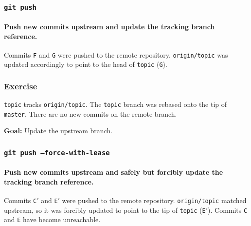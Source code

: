 \documentclass{beamer}
\newcommand\gitcmd[1]{\texttt{git #1}}
\newcommand\grefspec[1]{\texttt{#1}}
\newcommand\gbranch[1]{\texttt{#1}}
\newcommand\gremotebranch[1]{\texttt{#1}}
\newcommand\goal[1]{\textbf{Goal:} #1}
\begin{document}
\begin{frame}
  \frametitle{\gitcmd{push}}
  \framesubtitle{Push new commits upstream and update the tracking branch reference.}

  \begin{figure}
    \centering
  \end{figure}

  Commits \grefspec{F} and \grefspec{G} were pushed to the remote repository.
  \gremotebranch{origin/topic} was updated accordingly to point to the head of \gbranch{topic} (\grefspec{G}).
\end{frame}

\begin{frame}
  \frametitle{Exercise}

  \gbranch{topic} tracks \gbranch{origin/topic}. The \gbranch{topic} branch was rebased onto the tip of \gbranch{master}.
  There are no new commits on the remote branch.

  \goal{Update the upstream branch.}

  \begin{figure}
    \centering
  \end{figure}
\end{frame}

\begin{frame}
  \frametitle{\gitcmd{push --force-with-lease}}
  \framesubtitle{Push new commits upstream and safely but forcibly update the tracking branch reference.}

  \begin{figure}
    \centering
  \end{figure}

  Commits \grefspec{C$'$} and \grefspec{E$'$} were pushed to the remote repository.
  \gremotebranch{origin/topic} matched upstream, so it was forcibly updated to point to the tip of \gbranch{topic} (\grefspec{E$'$}).
  Commits \grefspec{C} and \grefspec{E} have become unreachable.
\end{frame}
\end{document}
